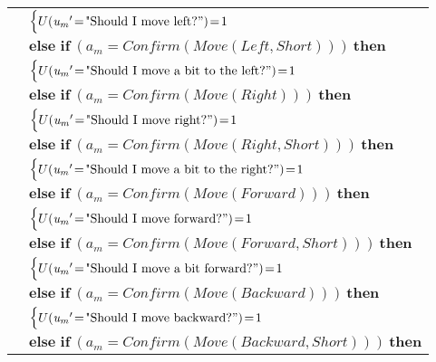 \begin{footnotesize}
\begin{longtable}{p{2cm}l}
& \;\;\;\;\; $ \begin{cases}U(\mathit{u_m}'\!=\!\text{"Should I move left?}")\!=\!1 \end{cases}$ \vspace{1mm} \\ & $ \textbf{else if} \ (\mathit{a_m}\!=\!\mathit{Confirm(Move(Left,Short))}) \ \textbf{then}$ \\
& \;\;\;\;\; $ \begin{cases}U(\mathit{u_m}'\!=\!\text{"Should I move a bit to the left?}")\!=\!1 \end{cases}$ \vspace{1mm} \\ & $ \textbf{else if} \ (\mathit{a_m}\!=\!\mathit{Confirm(Move(Right))}) \ \textbf{then}$ \\
& \;\;\;\;\; $ \begin{cases}U(\mathit{u_m}'\!=\!\text{"Should I move right?}")\!=\!1 \end{cases}$ \vspace{1mm} \\ & $ \textbf{else if} \ (\mathit{a_m}\!=\!\mathit{Confirm(Move(Right,Short))}) \ \textbf{then}$ \\
& \;\;\;\;\; $ \begin{cases}U(\mathit{u_m}'\!=\!\text{"Should I move a bit to the right?}")\!=\!1 \end{cases}$ \vspace{1mm} \\ & $ \textbf{else if} \ (\mathit{a_m}\!=\!\mathit{Confirm(Move(Forward))}) \ \textbf{then}$ \\
& \;\;\;\;\; $ \begin{cases}U(\mathit{u_m}'\!=\!\text{"Should I move forward?}")\!=\!1 \end{cases}$ \vspace{1mm} \\ & $ \textbf{else if} \ (\mathit{a_m}\!=\!\mathit{Confirm(Move(Forward,Short))}) \ \textbf{then}$ \\
& \;\;\;\;\; $ \begin{cases}U(\mathit{u_m}'\!=\!\text{"Should I move a bit forward?}")\!=\!1 \end{cases}$ \vspace{1mm} \\ & $ \textbf{else if} \ (\mathit{a_m}\!=\!\mathit{Confirm(Move(Backward))}) \ \textbf{then}$ \\
& \;\;\;\;\; $ \begin{cases}U(\mathit{u_m}'\!=\!\text{"Should I move backward?}")\!=\!1 \end{cases}$ \vspace{1mm} \\ & $ \textbf{else if} \ (\mathit{a_m}\!=\!\mathit{Confirm(Move(Backward,Short))}) \ \textbf{then}$ \\

\end{longtable}
\end{footnotesize}
